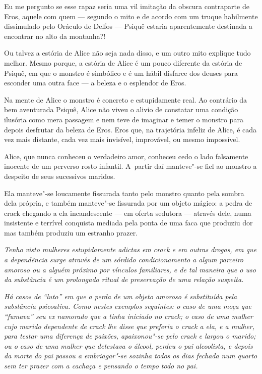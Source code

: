 Eu me pergunto se esse rapaz seria uma vil imitação da obscura
contraparte de Eros, aquele com quem --- segundo o mito e de acordo com
um truque habilmente dissimulado pelo Oráculo de Delfos --- Psiquê
estaria aparentemente destinada a encontrar no alto da montanha?!

Ou talvez a estória de Alice não seja nada disso, e um outro mito
explique tudo melhor. Mesmo porque, a estória de Alice é um pouco
diferente da estória de Psiquê, em que o monstro é simbólico e é um
hábil disfarce dos deuses para esconder uma outra face --- a beleza e o
esplendor de Eros.

Na mente de Alice o monstro é concreto e estupidamente real. Ao
contrário da bem aventurada Psiquê, Alice não viveu o alivio de
constatar uma condição ilusória como mera passagem e nem teve de
imaginar e temer o monstro para depois desfrutar da beleza de Eros. Eros
que, na trajetória infeliz de Alice, é cada vez mais distante, cada vez
mais invisível, improvável, ou mesmo impossível.

Alice, que nunca conheceu o verdadeiro amor, conheceu cedo o lado
falsamente inocente de um perverso rosto infantil. A~partir daí
manteve"-se fiel ao monstro a despeito de seus sucessivos maridos.

Ela manteve"-se loucamente fissurada tanto pelo monstro quanto pela
sombra dela própria, e também manteve"-se fissurada por um objeto mágico:
a pedra de crack chegando a ela incandescente --- em oferta sedutora ---
através dele, numa insistente e terrível conquista mediada pela ponta de
uma faca que produziu dor mas também produziu um estranho prazer.~

\begin{center}\asterisc{}\end{center}


\emph{Tenho visto mulheres estupidamente adictas em crack e em outras
drogas, em que a dependência surge através de um sórdido condicionamento
a algum parceiro amoroso ou a alguém próximo por vínculos familiares, e
de tal maneira que o uso da substância é um prolongado ritual de
preservação de uma relação suspeita.}~

\emph{Há casos de ``luto'' em que a perda de um objeto amoroso é
substituída pela substância psicoativa. Como nestes exemplos seguintes:
o caso de uma moça que ``fumava'' seu ex namorado que a tinha iniciado
no crack; o caso de uma mulher cujo marido dependente de crack lhe disse
que preferia o crack a ela, e a mulher, para testar uma diferença de
paixões, apaixonou"-se pelo crack e largou o marido; ou o caso de uma
mulher que detestava o álcool, perdeu o pai alcoolista, e depois da
morte do pai passou a embriagar"-se sozinha todos os dias fechada num
quarto sem ter prazer com a cachaça e pensando o tempo todo no pai.}~

